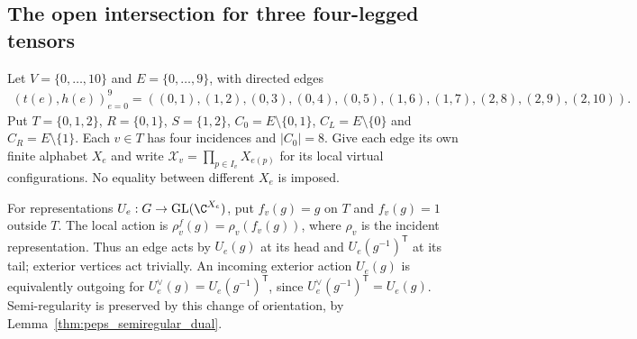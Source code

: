 \subsection{The open intersection for three four-legged tensors}
\label{sec:peps_general_three_block_intersection}

\begin{definition}%
    \label{def:peps_general_three_block_geometry}
    \leanok
    Let $V=\{0,\ldots,10\}$ and $E=\{0,\ldots,9\}$, with directed edges
    \begin{align}
        (t(e),h(e))_{e=0}^{9}
        =((0,1),(1,2),(0,3),(0,4),(0,5),
        (1,6),(1,7),(2,8),(2,9),(2,10)).
        \label{eq:peps_general_three_edges}
    \end{align}
    Put $T=\{0,1,2\}$, $R=\{0,1\}$, $S=\{1,2\}$,
    $C_0=E\setminus\{0,1\}$, $C_L=E\setminus\{0\}$ and
    $C_R=E\setminus\{1\}$. Each $v\in T$ has four incidences and
    $|C_0|=8$. Give each edge its own finite alphabet $X_e$ and write
    $\mathcal X_v=\prod_{p\in I_v}X_{e(p)}$ for its local virtual
    configurations. No equality between different $X_e$ is imposed.
\end{definition}

\begin{definition}%
    \label{def:peps_three_block_core_action}
    \leanok
    For representations $U_e:G\to\operatorname{GL}(\C^{X_e})$, put
    $f_v(g)=g$ on $T$ and $f_v(g)=1$ outside $T$. The local action is
    $\rho_v^f(g)=\rho_v(f_v(g))$, where $\rho_v$ is the incident
    representation. Thus an edge acts by $U_e(g)$ at its head and
    $U_e(g^{-1})^{\mathsf T}$ at its tail; exterior vertices act trivially.
    An incoming exterior action $U_e(g)$ is equivalently outgoing for
    $U_e^\vee(g)=U_e(g^{-1})^{\mathsf T}$, since
    $U_e^\vee(g^{-1})^{\mathsf T}=U_e(g)$. Semi-regularity is preserved
    by this change of orientation, by Lemma~\ref{thm:peps_semiregular_dual}.
\end{definition}

